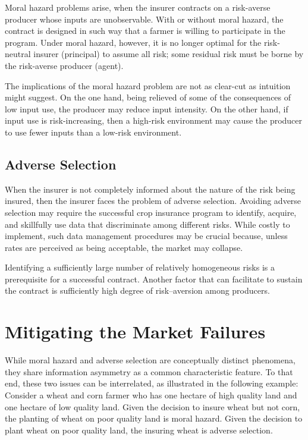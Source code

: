 \documentclass[]{book}
\begin{document}
Moral hazard problems arise, when the insurer contracts on a risk-averse
producer whose inputs are unobservable. With or without moral hazard,
the contract is designed in such way that a farmer is willing to
participate in the program. Under moral hazard, however, it is no longer
optimal for the risk-neutral insurer (principal) to assume all risk;
some residual risk must be borne by the risk-averse producer (agent).

The implications of the moral hazard problem are not as clear-cut as
intuition might suggest. On the one hand, being relieved of some of the
consequences of low input use, the producer may reduce input intensity.
On the other hand, if input use is risk-increasing, then a high-risk
environment may cause the producer to use fewer inputs than a low-risk
environment.

\subsection{Adverse Selection}\label{adverse-selection}

When the insurer is not completely informed about the nature of the risk
being insured, then the insurer faces the problem of adverse selection.
Avoiding adverse selection may require the successful crop insurance
program to identify, acquire, and skillfully use data that discriminate
among different risks. While costly to implement, such data management
procedures may be crucial because, unless rates are perceived as being
acceptable, the market may collapse.

Identifying a sufficiently large number of relatively homogeneous risks
is a prerequisite for a successful contract. Another factor that can
facilitate to sustain the contract is sufficiently high degree of
risk--aversion among producers.

\section{Mitigating the Market
Failures}\label{mitigating-the-market-failures}

While moral hazard and adverse selection are conceptually distinct
phenomena, they share information asymmetry as a common characteristic
feature. To that end, these two issues can be interrelated, as
illustrated in the following example: Consider a wheat and corn farmer
who has one hectare of high quality land and one hectare of low quality
land. Given the decision to insure wheat but not corn, the planting of
wheat on poor quality land is moral hazard. Given the decision to plant
wheat on poor quality land, the insuring wheat is adverse selection.
\end{document}
